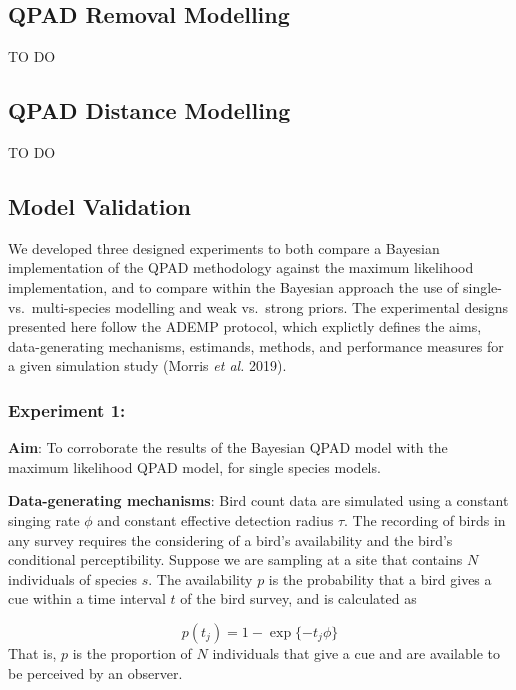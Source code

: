 \documentclass[
  11pt,
]{article}
\begin{document}
\hypertarget{qpad-removal-modelling}{%
\subsection{QPAD Removal Modelling}\label{qpad-removal-modelling}}

TO DO

\hypertarget{qpad-distance-modelling}{%
\subsection{QPAD Distance Modelling}\label{qpad-distance-modelling}}

TO DO

\hypertarget{model-validation}{%
\subsection{Model Validation}\label{model-validation}}

We developed three designed experiments to both compare a Bayesian
implementation of the QPAD methodology against the maximum likelihood
implementation, and to compare within the Bayesian approach the use of
single- vs.~multi-species modelling and weak vs.~strong priors. The
experimental designs presented here follow the ADEMP protocol, which
explictly defines the aims, data-generating mechanisms, estimands,
methods, and performance measures for a given simulation study (Morris
\emph{et al.} 2019).

\hypertarget{experiment-1}{%
\subsubsection{Experiment 1:}\label{experiment-1}}

\textbf{Aim}: To corroborate the results of the Bayesian QPAD model with
the maximum likelihood QPAD model, for single species models.

\textbf{Data-generating mechanisms}: Bird count data are simulated using
a constant singing rate \(\phi\) and constant effective detection radius
\(\tau\). The recording of birds in any survey requires the considering
of a bird's availability and the bird's conditional perceptibility.
Suppose we are sampling at a site that contains \(N\) individuals of
species \(s\). The availability \(p\) is the probability that a bird
gives a cue within a time interval \(t\) of the bird survey, and is
calculated as

\[
  p(t_j) = 1 - \exp\{-t_j \phi\}
\] That is, \(p\) is the proportion of \(N\) individuals that give a cue
and are available to be perceived by an observer.
\end{document}
